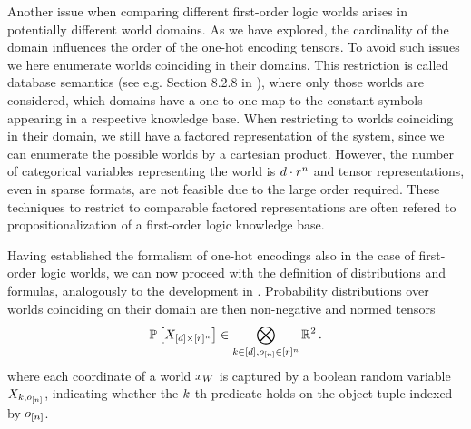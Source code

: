 Another issue when comparing different first-order logic worlds arises in potentially different world domains.
As we have explored, the cardinality of the domain influences the order of the one-hot encoding tensors.
To avoid such issues we here enumerate worlds coinciding in their domains.
This restriction is called database semantics (see e.g. Section 8.2.8 in \cite{russell_artificial_2021}), where only those worlds are considered, which domains have a one-to-one map to the constant symbols appearing in a respective knowledge base. %
When restricting to worlds coinciding in their domain, we still have a factored representation of the system, since we can enumerate the possible worlds by a cartesian product.
However, the number of categorical variables representing the world is $d\cdot r^{n}$ and tensor representations, even in sparse formats, are not feasible due to the large order required.
These techniques to restrict to comparable factored representations are often refered to propositionalization of a first-order logic knowledge base.








Having established the formalism of one-hot encodings also in the case of first-order logic worlds, we can now proceed with the definition of distributions and formulas, analogously to the development in .
Probability distributions over worlds coinciding on their domain are then non-negative and normed tensors
\begin{align*}
    \mathbb{P}\left[X_{[d]\times[r]^{n}}\right] \in \bigotimes_{k\in[d],o_{[n]}\in[r]^{n}} \mathbb{R}^2 \, .
\end{align*}
where each coordinate of a world $x_{W}$ is captured by a boolean random variable $X_{k,o_{[n]}}$, indicating whether the $k$-th predicate holds on the object tuple indexed by $o_{[n]}$.

